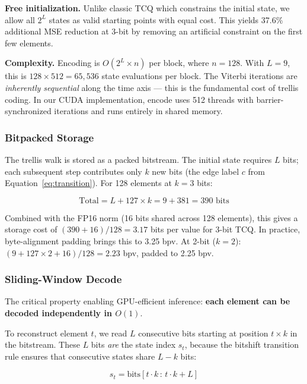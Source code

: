 \documentclass{article}
\begin{document}
\textbf{Free initialization.} Unlike classic TCQ which constrains the initial
state, we allow all $2^L$ states as valid starting points with equal cost. This
yields 37.6\% additional MSE reduction at 3-bit by removing an artificial
constraint on the first few elements.

\textbf{Complexity.} Encoding is $O(2^L \times n)$ per block, where $n = 128$.
With $L = 9$, this is $128 \times 512 = 65{,}536$ state evaluations per block.
The Viterbi iterations are \emph{inherently sequential} along the time axis —
this is the fundamental cost of trellis coding. In our CUDA implementation,
encode uses 512 threads with barrier-synchronized iterations and runs entirely
in shared memory.

\subsubsection{Bitpacked Storage}

The trellis walk is stored as a packed bitstream. The initial state requires $L$
bits; each subsequent step contributes only $k$ new bits (the edge label $c$
from Equation~\ref{eq:transition}). For 128 elements at $k = 3$ bits:

\begin{equation}
\text{Total} = L + 127 \times k = 9 + 381 = 390 \text{ bits}
\end{equation}

Combined with the FP16 norm (16 bits shared across 128 elements), this gives a
storage cost of $(390 + 16) / 128 = 3.17$ bits per value for 3-bit TCQ. In
practice, byte-alignment padding brings this to 3.25 bpv. At 2-bit ($k = 2$):
$(9 + 127 \times 2 + 16) / 128 = 2.23$ bpv, padded to 2.25 bpv.

\subsubsection{Sliding-Window Decode}
\label{sec:decode}

The critical property enabling GPU-efficient inference: \textbf{each element can
be decoded independently in $O(1)$}.

To reconstruct element $t$, we read $L$ consecutive bits starting at position
$t \times k$ in the bitstream. These $L$ bits \emph{are} the state index $s_t$,
because the bitshift transition rule ensures that consecutive states share
$L - k$ bits:

\begin{equation}
s_t = \mathrm{bits}[t \cdot k \,:\, t \cdot k + L]
\end{equation}
\end{document}
